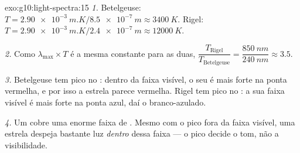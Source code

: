 \begin{solution}{exo:g10:light-spectra:15}
\emph{1.} Betelgeuse:
$T = \qty{2.90e-3}{m.K} / \qty{8.5e-7}{m} \approx \qty{3400}{K}$. Rigel:
$T = \qty{2.90e-3}{m.K} / \qty{2.4e-7}{m} \approx \qty{12000}{K}$.

\emph{2.} Como $\lambda_{\max} \times T$ é a mesma constante para as duas,
$\dfrac{T_{\text{Rigel}}}{T_{\text{Betelgeuse}}}
= \dfrac{\qty{850}{nm}}{\qty{240}{nm}} \approx 3.5$.

\emph{3.} Betelgeuse tem pico no : dentro da faixa visível, o
seu  é mais forte na ponta vermelha, e por isso a estrela parece
vermelha. Rigel tem pico no : a sua faixa visível é mais forte
na ponta azul, daí o branco-azulado.

\emph{4.} Um  cobre uma enorme faixa de . Mesmo com o pico fora da faixa visível, uma estrela despeja bastante
luz \emph{dentro} dessa faixa --- o pico decide o tom, não a visibilidade.
\end{solution}

